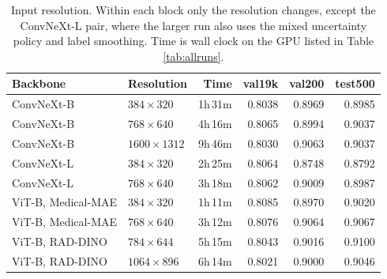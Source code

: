 
\begin{table}[H]
  \caption{Input resolution. Within each block only the resolution changes, except
  the ConvNeXt-L pair, where the larger run also uses the mixed uncertainty policy
  and label smoothing. Time is wall clock on the GPU listed in
  Table \ref{tab:allruns}.}
  \centering
  \footnotesize
  \begin{tabular}{llrrrr}
    \toprule
    Backbone & Resolution & Time & val19k & val200 & test500 \\
    \midrule
    ConvNeXt-B & $384\times320$ & 1h\,31m & 0.8038 & 0.8969 & 0.8985 \\
    ConvNeXt-B & $768\times640$ & 4h\,16m & 0.8065 & 0.8994 & 0.9037 \\
    ConvNeXt-B & $1600\times1312$ & 9h\,46m & 0.8030 & 0.9063 & 0.9037 \\
    \midrule
    ConvNeXt-L & $384\times320$ & 2h\,25m & 0.8064 & 0.8748 & 0.8792 \\
    ConvNeXt-L & $768\times640$ & 3h\,18m & 0.8062 & 0.9009 & 0.8987 \\
    \midrule
    ViT-B, Medical-MAE & $384\times320$ & 1h\,11m & 0.8085 & 0.8970 & 0.9020 \\
    ViT-B, Medical-MAE & $768\times640$ & 3h\,12m & 0.8076 & 0.9064 & 0.9067 \\
    \midrule
    ViT-B, RAD-DINO & $784\times644$ & 5h\,15m & 0.8043 & 0.9016 & 0.9100 \\
    ViT-B, RAD-DINO & $1064\times896$ & 6h\,14m & 0.8021 & 0.9000 & 0.9046 \\
    \bottomrule
  \end{tabular}
  \label{tab:res}
\end{table}
